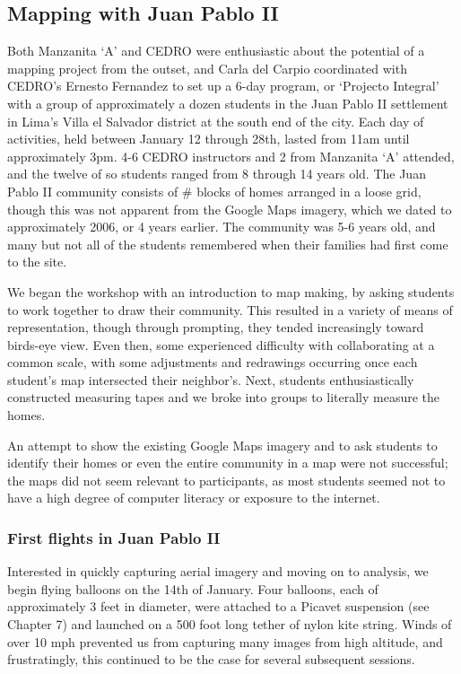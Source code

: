 \documentclass[11pt]{report}
\begin{document}
\subsection{Mapping with Juan Pablo II}

Both Manzanita `A' and CEDRO were enthusiastic about the potential of a mapping project from the outset, and Carla del Carpio coordinated with CEDRO's Ernesto Fernandez to set up a 6-day program, or `Projecto Integral' with a group of approximately a dozen students in the Juan Pablo II settlement in Lima's Villa el Salvador district at the south end of the city. Each day of activities, held between January 12 through 28th, lasted from 11am until approximately 3pm. 4-6 CEDRO instructors and 2 from Manzanita `A' attended, and the twelve of so students ranged from 8 through 14 years old. The Juan Pablo II community consists of \# blocks of homes arranged in a loose grid, though this was not apparent from the Google Maps imagery, which we dated to approximately 2006, or 4 years earlier. The community was 5-6 years old, and many but not all of the students remembered when their families had first come to the site. 

We began the workshop with an introduction to map making, by asking students to work together to draw their community. This resulted in a variety of means of representation, though through prompting, they tended increasingly toward birds-eye view. Even then, some experienced difficulty with collaborating at a common scale, with some adjustments and redrawings occurring once each student's map intersected their neighbor's. Next, students enthusiastically constructed measuring tapes and we broke into groups to literally measure the homes. 

An attempt to show the existing Google Maps imagery and to ask students to identify their homes or even the entire community in a map were not successful; the maps did not seem relevant to participants, as most students seemed not to have a high degree of computer literacy or exposure to the internet. 

\subsubsection{First flights in Juan Pablo II}

Interested in quickly capturing aerial imagery and moving on to analysis, we begin flying balloons on the 14th of January. Four balloons, each of approximately 3 feet in diameter, were attached to a Picavet suspension (see Chapter 7) and launched on a 500 foot long tether of nylon kite string. Winds of over 10 mph prevented us from capturing many images from high altitude, and frustratingly, this continued to be the case for several subsequent sessions. 
\end{document}
